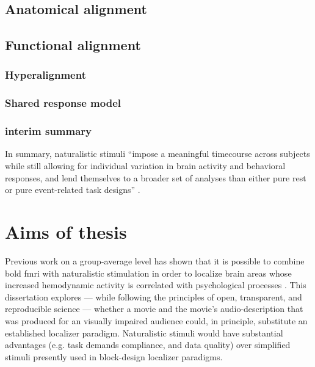 

\subsection{Anatomical alignment}


\subsection{Functional alignment}


\subsubsection{Hyperalignment}


\subsubsection{Shared response model}


\subsubsection{interim summary}
In summary, naturalistic stimuli ``impose a meaningful timecourse across
subjects while still allowing for individual variation in brain activity and
behavioral responses, and lend themselves to a broader set of analyses than
either pure rest or pure event-related task designs'' \citep{finn2017can}.



\section{Aims of thesis}



%
Previous work on a group-average level has shown that it is possible to combine
\ac{bold} \ac{fmri} with naturalistic stimulation in order to localize brain
areas whose increased hemodynamic activity is correlated with psychological
processes \citep{bartels2004mapping}.
%
This dissertation explores --- while following the principles of open,
transparent, and reproducible science --- whether a movie and the movie's
audio-description that was produced for an visually impaired audience could, in
principle, substitute an established localizer paradigm.
%
Naturalistic stimuli would have substantial advantages (e.g. task demands
compliance, and data quality) over simplified stimuli presently used in
block-design localizer paradigms.

